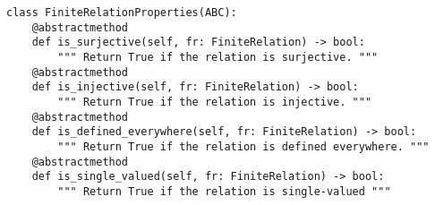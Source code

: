 \begin{verbatim}
class FiniteRelationProperties(ABC):
    @abstractmethod
    def is_surjective(self, fr: FiniteRelation) -> bool:
        """ Return True if the relation is surjective. """
    @abstractmethod
    def is_injective(self, fr: FiniteRelation) -> bool:
        """ Return True if the relation is injective. """
    @abstractmethod
    def is_defined_everywhere(self, fr: FiniteRelation) -> bool:
        """ Return True if the relation is defined everywhere. """
    @abstractmethod
    def is_single_valued(self, fr: FiniteRelation) -> bool:
        """ Return True if the relation is single-valued """
\end{verbatim}